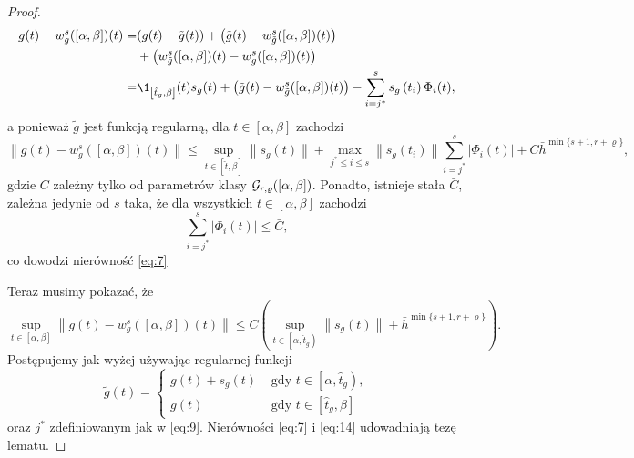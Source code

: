 \documentclass[oik, pdftex, robocza, man]{mgrwms}
\begin{document}
\begin{proof}
\begin{equation*}
\begin{aligned}
                g(t)-w_{g}^{s}([\alpha, \beta])(t)=&(g(t)-\tilde{g}(t))+\left(\tilde{g}(t)-w_{\tilde{g}}^{s}([\alpha, \beta])(t)\right) \\
                &+\left(w_{\tilde{g}}^{s}([\alpha, \beta])(t)-w_{g}^{s}([\alpha, \beta])(t)\right) \\
                =& \1_{\left[\hat{t}_{g}, \beta\right]}(t) s_{g}(t)+\left(\tilde{g}(t)-w_{\tilde{g}}^{s}([\alpha, \beta])(t)\right)-\sum_{i=j^{*}}^{s} s_{g}\left(t_{i}\right) \Phi_{i}(t),
            \end{aligned}
        \end{equation*}
        a ponieważ $\tilde{g}$ jest funkcją regularną, dla $t \in[\alpha, \beta]$ zachodzi
        \begin{equation*}
            \left\|g(t)-w_{g}^{s}([\alpha, \beta])(t)\right\| \leq 
                \sup _{t \in[\hat{t}, \beta]}\left\|s_{g}(t)\right\|+\max _{j^{*} \leq i \leq s}\left\|s_{g}\left(t_{i}\right)\right\| \sum_{i=j^{*}}^{s}\left|\Phi_{i}(t)\right|+C \bar{h}^{\min \{s+1, r+\varrho\}},
        \end{equation*}
        gdzie $C$ zależny tylko od parametrów klasy $\mathcal{G}_{r,\varrho}([\alpha,\beta])$. Ponadto, istnieje stała $\bar{C}$, zależna jedynie od $s$ taka, że dla wszystkich $t \in[\alpha, \beta]$ zachodzi
        \begin{equation} \label{eq:13}
            \sum_{i=j^{*}}^{s}\left|\Phi_{i}(t)\right| \leq \bar{C},
        \end{equation}
        co dowodzi nierówność \eqref{eq:7}

        Teraz musimy pokazać, że
        \begin{equation} \label{eq:14}
            \sup _{t \in[\alpha, \beta]}\left\|g(t)-w_{g}^{s}([\alpha, \beta])(t)\right\| \leq C\left(\sup _{t \in\left[\alpha, \hat{t}_{g}\right)}\left\|s_{g}(t)\right\|+\bar{h}^{\min \{s+1, r+\varrho\}}\right).
        \end{equation}
        Postępujemy jak wyżej używając regularnej funkcji
        \begin{equation} \label{eq:15:tilde_g_z_plusem}
            \tilde{g}(t)= \begin{cases}
                g(t)+s_{g}(t)    & \text { gdy } t \in\left[\alpha, \hat{t}_{g}\right), \\ 
                g(t)             & \text { gdy } t \in\left[\hat{t}_{g}, \beta\right]
            \end{cases}
        \end{equation}
        oraz $j^{*}$ zdefiniowanym jak w \eqref{eq:9}.
        Nierówności \eqref{eq:7} i \eqref{eq:14} udowadniają tezę lematu.
    \end{proof}
\end{document}
